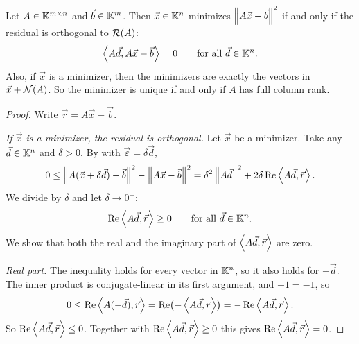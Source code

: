 \begin{theorem}
  \label{thm:ls-optimality}
  Let $A \in \mathbb{K}^{m \times n}$ and $\vec{b} \in \mathbb{K}^m$. Then $\vec{x} \in \mathbb{K}^n$ minimizes $\left\lVert A\vec{x} - \vec{b} \right\rVert^2$ if and only if the residual is orthogonal to $\mathcal{R}(A)$:
  \begin{equation}
    \label{eq:ls-orth}
    \left\langle A\vec{d}, A\vec{x} - \vec{b} \right\rangle = 0 \qquad \text{for all } \vec{d} \in \mathbb{K}^n.
  \end{equation}
  Also, if $\vec{x}$ is a minimizer, then the minimizers are exactly the vectors in $\vec{x} + \mathcal{N}(A)$. So the minimizer is unique if and only if $A$ has full column rank.
\end{theorem}

\begin{proof}
  Write $\vec{r} = A\vec{x} - \vec{b}$.

  \emph{If $\vec{x}$ is a minimizer, the residual is orthogonal.} Let $\vec{x}$ be a minimizer. Take any $\vec{d} \in \mathbb{K}^n$ and $\delta > 0$. By  with $\vec{\varepsilon} = \delta\vec{d}$,
  \begin{equation}
    0 \le \left\lVert A(\vec{x} + \delta\vec{d}) - \vec{b} \right\rVert^2 - \left\lVert A\vec{x} - \vec{b} \right\rVert^2 = \delta^2\left\lVert A\vec{d} \right\rVert^2 + 2\delta\operatorname{Re}\left\langle A\vec{d}, \vec{r} \right\rangle.
  \end{equation}
  We divide by $\delta$ and let $\delta \to 0^+$:
  \begin{equation*}
    \operatorname{Re}\left\langle A\vec{d}, \vec{r} \right\rangle \ge 0 \qquad \text{for all } \vec{d} \in \mathbb{K}^n.
  \end{equation*}
  We show that both the real and the imaginary part of $\left\langle A\vec{d}, \vec{r} \right\rangle$ are zero.

  \emph{Real part.} The inequality holds for every vector in $\mathbb{K}^n$, so it also holds for $-\vec{d}$. The inner product is conjugate-linear in its first argument, and $\overline{-1} = -1$, so
  \begin{equation*}
    0 \le \operatorname{Re}\left\langle A(-\vec{d}), \vec{r} \right\rangle = \operatorname{Re}\bigl(-\left\langle A\vec{d}, \vec{r} \right\rangle\bigr) = -\operatorname{Re}\left\langle A\vec{d}, \vec{r} \right\rangle.
  \end{equation*}
  So $\operatorname{Re}\left\langle A\vec{d}, \vec{r} \right\rangle \le 0$. Together with $\operatorname{Re}\left\langle A\vec{d}, \vec{r} \right\rangle \ge 0$ this gives $\operatorname{Re}\left\langle A\vec{d}, \vec{r} \right\rangle = 0$.


\end{proof}
